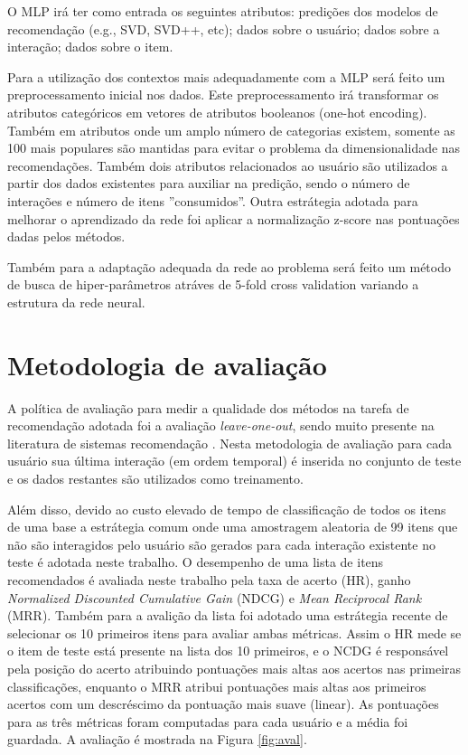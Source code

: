 \documentclass[sigconf]{acmart}
\begin{document}
O MLP irá ter como entrada os seguintes atributos: predições dos modelos de recomendação (e.g., SVD, SVD++, etc); dados sobre o usuário; dados sobre a interação; dados sobre o item.

Para a utilização dos contextos mais adequadamente com a MLP será feito um preprocessamento inicial nos dados. Este preprocessamento irá transformar os atributos categóricos em vetores de atributos booleanos (one-hot encoding). Também em atributos onde um amplo número de categorias existem, somente as 100 mais populares são mantidas para evitar o problema da dimensionalidade nas recomendações. Também dois atributos relacionados ao usuário são utilizados a partir dos dados existentes para auxiliar na predição, sendo o número de interações e número de itens ''consumidos''. Outra estrátegia adotada para melhorar o aprendizado da rede foi aplicar a normalização z-score nas pontuações dadas pelos métodos.

Também para a adaptação adequada da rede ao problema será feito um método de busca de hiper-parâmetros atráves de 5-fold cross validation variando a estrutura da rede neural.

\section{Metodologia de avaliação}

A política de avaliação para medir a qualidade dos métodos na tarefa de recomendação adotada foi a avaliação \textit{leave-one-out}, sendo muito presente na literatura de sistemas recomendação \cite{he2017neural,rendle2012bpr}. Nesta metodologia de avaliação para cada usuário sua última interação (em ordem temporal) é inserida no conjunto de teste e os dados restantes são utilizados como treinamento. 

Além disso, devido ao custo elevado de tempo de classificação de todos os itens de uma base a estrátegia comum \cite{koren2008factorization} onde uma amostragem aleatoria de 99 itens que não são interagidos pelo usuário são gerados para cada interação existente no teste é adotada neste trabalho. O desempenho de uma lista de itens recomendados é avaliada neste trabalho pela taxa de acerto (HR), ganho \textit{Normalized Discounted Cumulative Gain} (NDCG) e \textit{Mean Reciprocal Rank} (MRR). Também para a avalição da lista foi adotado uma estrátegia recente \cite{he2017neural} de selecionar os 10 primeiros itens para avaliar ambas métricas. Assim o HR mede se o item de teste está presente na lista dos 10 primeiros, e o NCDG é responsável pela posição do acerto atribuindo pontuações mais altas aos acertos nas primeiras classificações, enquanto o MRR atribui pontuações mais altas aos primeiros acertos com um descréscimo da pontuação mais suave (linear). As pontuações para as três métricas foram computadas para cada usuário e a média foi guardada. A avaliação é mostrada na Figura \ref{fig:aval}.
\end{document}
